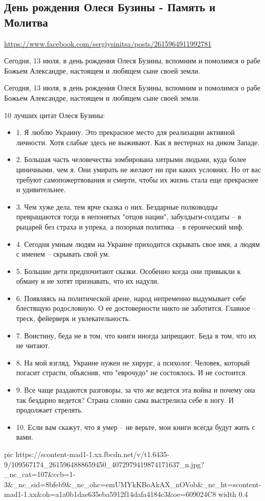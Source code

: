  
 
 
 
 
\subsection{День рождения Олеся Бузины - Память и Молитва}
\label{sec:13_06_2020.fb.sinitsa_sergey.1.buzina_citations}
\url{https://www.facebook.com/sergiysinitsa/posts/2615964911992781}

Сегодня, 13 июля, в день рождения Олеся Бузины, вспомним и помолимся о рабе Божьем Александре, настоящем и любящем сыне своей земли. 


Сегодня, 13 июля, в день рождения Олеся Бузины, вспомним и помолимся о рабе Божьем Александре, настоящем и любящем сыне своей земли. 

10 лучших цитат Олеся Бузины:

\begin{itemize}
  \item 1. Я люблю Украину. Это прекрасное место для реализации активной личности. Хотя слабые здесь не выживают. Как в вестернах на диком Западе.
  \item 2. Большая часть человечества зомбирована хитрыми людьми, куда более циничными, чем я. Они умирать не желают ни при каких условиях. Но от вас требуют самопожертвования и смерти, чтобы их жизнь стала еще прекраснее и удивительнее. 
  \item 3. Чем хуже дела, тем ярче сказка о них. Бездарные полководцы превращаются тогда в непонятых "отцов нации", забулдыги-солдаты – в рыцарей без страха и упрека, а позорная политика – в героический миф. 
  \item 4. Сегодня умным людям на Украине приходится скрывать свое имя, а людям с именем – скрывать свой ум.
  \item 5. Большие дети предпочитают сказки. Особенно когда они привыкли к обману и не хотят признавать, что их надули.
  \item 6. Появляясь на политической арене, народ непременно выдумывает себе блестящую родословную. О ее достоверности никто не заботится. Главное – треск, фейерверк и увлекательность. 
  \item 7. Воистину, беда не в том, что книги иногда запрещают. Беда в том, что их не читают. 
  \item 8. На мой взгляд, Украине нужен не хирург, а психолог. Человек, который погасит страсти, объяснив, что "еврочудо" не состоялось. И не состоится.
  \item 9. Все чаще раздаются разговоры, за что же ведется эта война и почему она так бездарно ведется? Страна словно сама выстрелила себе в ногу. И продолжает стрелять.
  \item 10. Если вам скажут, что я умер – не верьте, мои книги всегда будут жить с вами.
\end{itemize}

\ifcmt
  pic https://scontent-mad1-1.xx.fbcdn.net/v/t1.6435-9/109567174_2615964888659450_4072979419874171637_n.jpg?_nc_cat=107&ccb=1-3&_nc_sid=8bfeb9&_nc_ohc=emUMYkKBoAkAX_nOVob&_nc_ht=scontent-mad1-1.xx&oh=a1a0b1dae635eba5912f14dafa4184c3&oe=609024C8
  width 0.4
\fi

